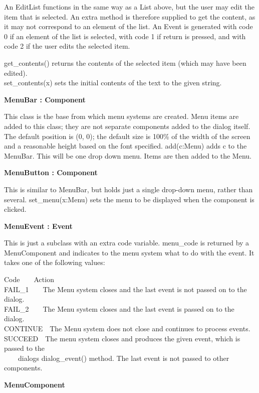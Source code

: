 An EditList functions in the same way as a List above, but the user may
edit the item that is selected. An extra method is therefore supplied
to get the content, as it may not correspond to an element of the list.
An Event is generated with code 0 if an element of the list is
selected, with code 1 if return is pressed, and with code 2 if the user
edits the selected item.

get\_contents() returns the contents of the selected item (which may
have been edited).\\
set\_contents(x) sets the initial contents of the text to the given
string.

{\sffamily\bfseries
{}MenuBar : Component}

This class is the base from which menu systems are created. Menu items
are added to this class; they are not separate components added to the
dialog itself. The default position is (0, 0); the default size is
100\% of the width of the screen and a reasonable height based on the
font specified. add(c:Menu) adds c to the MenuBar. This will be one
drop down menu. Items are then added to the Menu.

{\sffamily\bfseries
{}MenuButton : Component}

This is similar to MenuBar, but holds just a single drop-down menu,
rather than several. set\_menu(x:Menu) sets the menu to be displayed
when the component is clicked.

{\sffamily\bfseries
{}MenuEvent : Event}

This is just a subclass with an extra code variable. menu\_code is
returned by a MenuComponent and indicates to the menu system what to do
with the event. It takes one of the following values:

Code\ \ \ \ Action\\
FAIL\_1\ \ \ \ The Menu system closes and the last event is not passed
on to the dialog.\\
FAIL\_2\ \ \ \ The Menu system closes and the last event is passed on to
the dialog.\\
CONTINUE\ \ The Menu system does not close and continues to process
events.\\
SUCCEED\ \ The menu system closes and produces the given event, which is
passed to the\\
 \ \ \ \ dialog{\textquotesingle}s dialog\_event() method. The last
event is not passed to other components.

{\sffamily\bfseries
{}MenuComponent}

